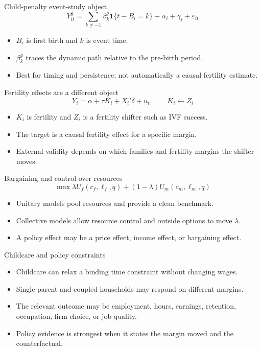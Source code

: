 \documentclass[aspectratio=169,11pt]{beamer}
\begin{document}
\begin{frame}{Child-penalty event-study object}
\[
Y_{it}^{g} =
\sum_{k \neq -1}\beta_k^{g}\mathbf{1}\{t-B_i=k\}
+\alpha_i+\gamma_t+\varepsilon_{it}
\]
\begin{itemize}
    \item \(B_i\) is first birth and \(k\) is event time.
    \item \(\beta_k^{g}\) traces the dynamic path relative to the pre-birth period.
    \item Best for timing and persistence; not automatically a causal fertility estimate.
\end{itemize}
\end{frame}

\begin{frame}{Fertility effects are a different object}
\[
Y_i = \alpha + \tau K_i + X_i'\delta + u_i,
\qquad K_i \leftarrow Z_i
\]
\begin{itemize}
    \item \(K_i\) is fertility and \(Z_i\) is a fertility shifter such as IVF success.
    \item The target is a causal fertility effect for a specific margin.
    \item External validity depends on which families and fertility margins the shifter moves.
\end{itemize}
\end{frame}

\begin{frame}{Bargaining and control over resources}
\[
\max \lambda U_f(c_f,\ell_f,q)+(1-\lambda)U_m(c_m,\ell_m,q)
\]
\begin{itemize}
    \item Unitary models pool resources and provide a clean benchmark.
    \item Collective models allow resource control and outside options to move \(\lambda\).
    \item A policy effect may be a price effect, income effect, or bargaining effect.
\end{itemize}
\end{frame}

\begin{frame}{Childcare and policy constraints}
\begin{itemize}
    \item Childcare can relax a binding time constraint without changing wages.
    \item Single-parent and coupled households may respond on different margins.
    \item The relevant outcome may be employment, hours, earnings, retention, occupation, firm choice, or job quality.
    \item Policy evidence is strongest when it states the margin moved and the counterfactual.
\end{itemize}
\end{frame}
\end{document}
